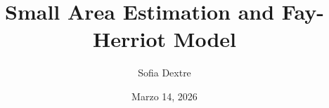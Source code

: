 \documentclass[12pt]{article} %
\theoremstyle{definition}
\begin{document}
\title{Small Area Estimation and Fay-Herriot Model}
\author{Sofia Dextre}
\date{Marzo 14, 2026}

\maketitle %






\end{document}
